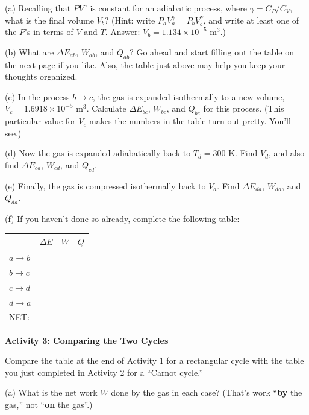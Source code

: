 (a) Recalling that $PV^\gamma$ is constant for an adiabatic process, where $\gamma = C_P / C_V$, what is the final volume $V_b$?  (Hint: write $P_a V_a^\gamma = P_b V_b^\gamma$, and write at least one of the $P$'s in terms of $V$ and $T$. Answer: $V_b=1.134 \times 10^{-5}$ m$^3$.)  
\answerspace{2.2in}

(b) What are $\Delta E_{ab}$, $W_{ab}$, and $Q_{ab}$?  Go ahead and start filling out the table on the next page if you like.  Also, the table just above may help you keep your thoughts organized.
\answerspace{1.6in}

\pagebreak
(c) In the process $b \rightarrow c$, the gas is expanded isothermally to a new volume, $V_c=1.6918 \times 10^{-5}$ m$^3$.  Calculate $\Delta E_{bc}$, $W_{bc}$, and $Q_{bc}$ for this process.  (This particular value for $V_c$ makes the numbers in the table turn out pretty.  You'll see.)
\answerspace{1.6in}

(d) Now the gas is expanded adiabatically back to $T_d=300$ K.  Find $V_d$, and also find  $\Delta E_{cd}$, $W_{cd}$, and $Q_{cd}$.
\answerspace{2.0in}


(e) Finally, the gas is compressed isothermally back to $V_a$.  Find $\Delta E_{da}$, $W_{da}$, and $Q_{da}$.  
\answerspace{1.6in}



(f) If you haven't done so already, complete the following table:
\vspace{0.1 in}

\renewcommand{\arraystretch}{2.0}
\begin{tabular}{| C{1in} |C{1in} | C{1in} | C{1in} |}
\hline
& $\Delta E$ & $W$ & $Q$ \\ \hline
$a \rightarrow b$ & & & \\ \hline
$b \rightarrow c$ & & & \\ \hline
$c \rightarrow d$ & & & \\ \hline
$d \rightarrow a$ & & & \\ \hline
\hline
NET: & & & \\ \hline
\end{tabular}
\renewcommand{\arraystretch}{1.0}

\pagebreak
\textbf{Activity 3: Comparing the Two Cycles}

Compare the table at the end of Activity 1 for a rectangular cycle with the table you just completed in Activity 2 for a ``Carnot cycle.'' 

(a)  What is the net work $W$ done by the gas in each case?  (That's work ``\textbf{by} the gas,'' not ``\textbf{on} the gas''.) 

